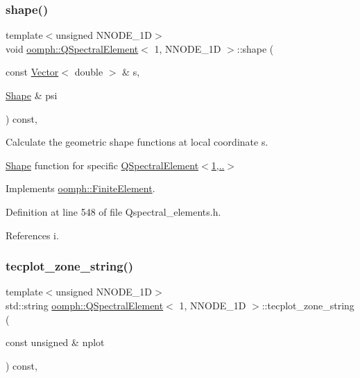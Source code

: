 \subsubsection{\texorpdfstring{shape()}{shape()}}
{\footnotesize\ttfamily template$<$unsigned N\+N\+O\+D\+E\+\_\+1D$>$ \\
void \hyperlink{classoomph_1_1QSpectralElement}{oomph\+::\+Q\+Spectral\+Element}$<$ 1, N\+N\+O\+D\+E\+\_\+1D $>$\+::shape (\begin{DoxyParamCaption}\item[{const \hyperlink{classoomph_1_1Vector}{Vector}$<$ double $>$ \&}]{s,  }\item[{\hyperlink{classoomph_1_1Shape}{Shape} \&}]{psi }\end{DoxyParamCaption}) const\hspace{0.3cm}{\ttfamily [inline]}, {\ttfamily [virtual]}}



Calculate the geometric shape functions at local coordinate s. 

\hyperlink{classoomph_1_1Shape}{Shape} function for specific \hyperlink{classoomph_1_1QSpectralElement_3_011_00_01NNODE__1D_01_4_a747bf14338887c74303f56febdfba957}{Q\+Spectral\+Element$<$1,..$>$} 

Implements \hyperlink{classoomph_1_1FiniteElement_a58a25b6859ddd43b7bfe64a19fee5023}{oomph\+::\+Finite\+Element}.



Definition at line 548 of file Qspectral\+\_\+elements.\+h.



References i.

\mbox{\label{classoomph_1_1QSpectralElement_3_011_00_01NNODE__1D_01_4_a250b5613ab76f43d9cd67dc01b8eb8fe}} 
\subsubsection{\texorpdfstring{tecplot\+\_\+zone\+\_\+string()}{tecplot\_zone\_string()}}
{\footnotesize\ttfamily template$<$unsigned N\+N\+O\+D\+E\+\_\+1D$>$ \\
std\+::string \hyperlink{classoomph_1_1QSpectralElement}{oomph\+::\+Q\+Spectral\+Element}$<$ 1, N\+N\+O\+D\+E\+\_\+1D $>$\+::tecplot\+\_\+zone\+\_\+string (\begin{DoxyParamCaption}\item[{const unsigned \&}]{nplot }\end{DoxyParamCaption}) const\hspace{0.3cm}{\ttfamily [inline]}, {\ttfamily [virtual]}}



